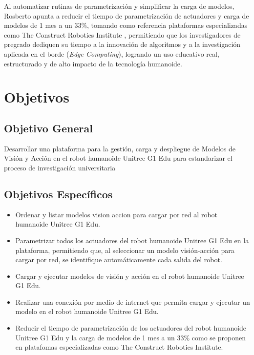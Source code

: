 \documentclass[stu,12pt,floatsintext]{apa7}
\begin{document}
Al automatizar rutinas de parametrización y simplificar la carga de modelos, Rosberto apunta a reducir el tiempo de parametrización de actuadores y carga de modelos de 1 mes a un 33\%, tomando como referencia plataformas especializadas como The Construct Robotics Institute \parencite{theconstruct2026humanoid}, permitiendo que los investigadores de pregrado dediquen su tiempo a la innovación de algoritmos y a la investigación aplicada en el borde (\textit{Edge Computing}), logrando un uso educativo real, estructurado y de alto impacto de la tecnología humanoide.

\clearpage


\section{Objetivos}



\subsection{Objetivo General}

Desarrollar una plataforma para la gestión, carga y despliegue de Modelos de Visión y Acción en
el robot humanoide Unitree G1 Edu para estandarizar el proceso de investigación universitaria

\subsection{Objetivos Específicos}
\begin{itemize}
    \item Ordenar y listar modelos vision accion para cargar por red al robot humanoide Unitree G1 Edu.
    \item Parametrizar todos los actuadores del robot humanoide Unitree G1 Edu en la plataforma, permitiendo que, al seleccionar un modelo visión-acción para cargar por red, se identifique automáticamente cada salida del robot.
    \item Cargar y ejecutar modelos de visión y acción en el robot humanoide Unitree G1 Edu.
    \item Realizar una conexión por medio de internet que permita cargar y ejecutar un modelo en el robot humanoide Unitree G1 Edu.
    \item Reducir el tiempo de parametrización de los actuadores del robot humanoide Unitree G1 Edu y la carga de modelos de 1 mes a un 33\% como se proponen en platafomas especializadas como The Construct Robotics Institute. 
\end{itemize}
\end{document}
